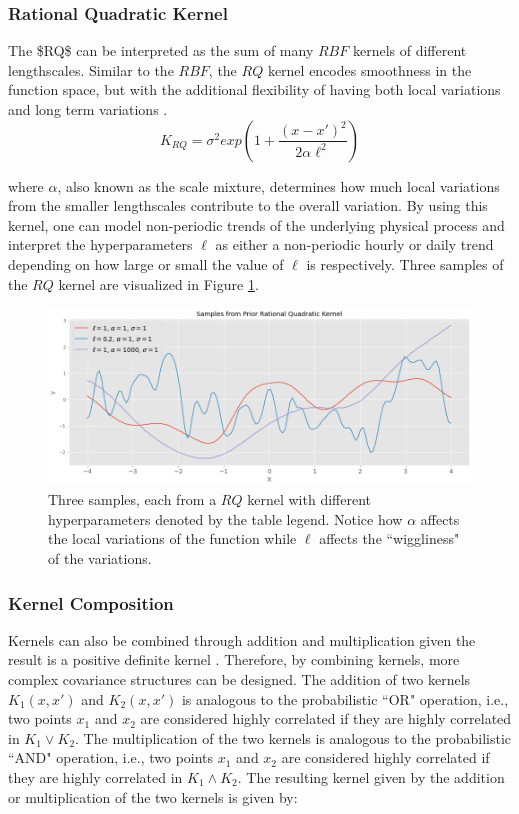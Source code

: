 \subsubsection{Rational Quadratic Kernel}

The \ac{$RQ$} can be interpreted as the sum of many $RBF$ kernels of different lengthscales. Similar to the $RBF$, the $RQ$ kernel encodes smoothness in the function space, but with the additional flexibility of having both local variations and long term variations \cite{gp_prices}. 
\begin{equation}
    K_{RQ} = \sigma^2 exp(1 + \frac{(x - x')^2}{2\alpha \ell^2})
\end{equation}

where $\alpha$, also known as the scale mixture, determines how much local variations from the smaller lengthscales contribute to the overall variation. By using this kernel, one can model non-periodic trends of the underlying physical process and interpret the hyperparameters $\ell$ as either a non-periodic hourly or daily trend depending on how large or small the value of $\ell$ is respectively. Three samples of the $RQ$ kernel are visualized in Figure \ref{fig:fig4}.

\begin{figure}[htp]
\centering
\graphicspath{ {./images/} }
\includegraphics[scale=0.49]{images/samples_rq_prior.png}
\caption{Three samples, each from a $RQ$ kernel with different hyperparameters denoted by the table legend. Notice how $\alpha$ affects the local variations of the function while $\ell$ affects the ``wiggliness" of the variations.}
\label{fig:fig4}
\end{figure}

\subsubsection{Kernel Composition}

Kernels can also be combined through addition and multiplication given the result is a positive definite kernel \cite{pml1Book}. Therefore, by combining kernels, more complex covariance structures can be designed. The addition of two kernels $K_1(x, x')$ and $K_2(x, x')$ is analogous to the probabilistic ``OR" operation, i.e., two points $x_1$ and $x_2$ are considered highly correlated if they are highly correlated in $K_1 \lor K_2$. The multiplication of the two kernels is analogous to the probabilistic ``AND" operation, i.e., two points $x_1$ and $x_2$ are considered highly correlated if they are highly correlated in $K_1 \land K_2$. The resulting kernel given by the addition or multiplication of the two kernels is given by:

